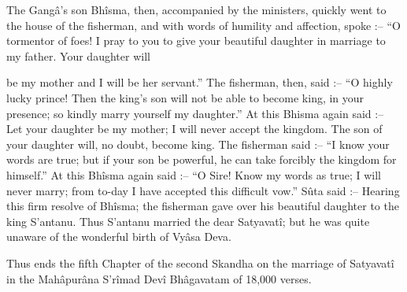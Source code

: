  

The Gangâ's son Bhîsma, then, accompanied by the ministers, quickly went to the house of the fisherman, and with words of humility and affection, spoke :-- “O tormentor of foes! I pray to you to give your beautiful daughter in marriage to my father. Your daughter will

 

 

be my mother and I will be her servant.” The fisherman, then, said :-- “O highly lucky prince! Then the king's son will not be able to become king, in your presence; so kindly marry yourself my daughter.” At this Bhisma again said :-- Let your daughter be my mother; I will never accept the kingdom. The son of your daughter will, no doubt, become king. The fisherman said :-- “I know your words are true; but if your son be powerful, he can take forcibly the kingdom for himself.” At this Bhîsma again said :-- “O Sire! Know my words as true; I will never marry; from to-day I have accepted this difficult vow.” Sûta said :-- Hearing this firm resolve of Bhîsma; the fisherman gave over his beautiful daughter to the king S’antanu. Thus S’antanu married the dear Satyavatî; but he was quite unaware of the wonderful birth of Vyâsa Deva.

 

Thus ends the fifth Chapter of the second Skandha on the marriage of Satyavatî in the Mahâpurâna S’rîmad Devî Bhâgavatam of 18,000 verses.

 
